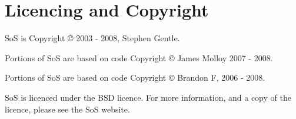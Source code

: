 \chapter{Licencing and Copyright}

SoS is Copyright © 2003 - 2008, Stephen Gentle.

Portions of SoS are based on code Copyright © James Molloy 2007 - 2008.

Portions of SoS are based on code Copyright © Brandon F, 2006 - 2008.

SoS is licenced under the BSD licence. For more information, and a copy of the licence, 
please see the SoS website.

